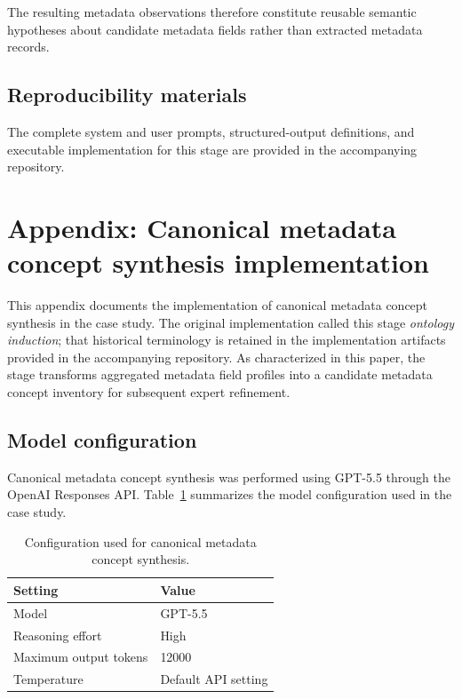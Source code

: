 \documentclass{article}
\begin{document}
The resulting metadata observations therefore constitute reusable semantic hypotheses about candidate metadata fields rather than extracted metadata records.

\subsection{Reproducibility materials}

The complete system and user prompts, structured-output definitions, and executable implementation for this stage are provided in the accompanying repository.

\section{Appendix: Canonical metadata concept synthesis implementation}
\label{appendix:ontology_induction}

This appendix documents the implementation of canonical metadata concept synthesis in the case study. The original implementation called this stage \emph{ontology induction}; that historical terminology is retained in the implementation artifacts provided in the accompanying repository. As characterized in this paper, the stage transforms aggregated metadata field profiles into a candidate metadata concept inventory for subsequent expert refinement.

\subsection{Model configuration}

Canonical metadata concept synthesis was performed using GPT-5.5 through the OpenAI Responses API. Table~\ref{tab:ontology_induction_configuration} summarizes the model configuration used in the case study.

\begin{table}[!ht]
    \centering
    \caption{Configuration used for canonical metadata concept synthesis.}
    \label{tab:ontology_induction_configuration}
    \begin{tabular}{ll}
    \toprule
    \textbf{Setting} & \textbf{Value} \\
    \midrule
    Model & GPT-5.5 \\
    Reasoning effort & High \\
    Maximum output tokens & 12000 \\
    Temperature & Default API setting \\
    \bottomrule
    \end{tabular}
\end{table}
\end{document}

